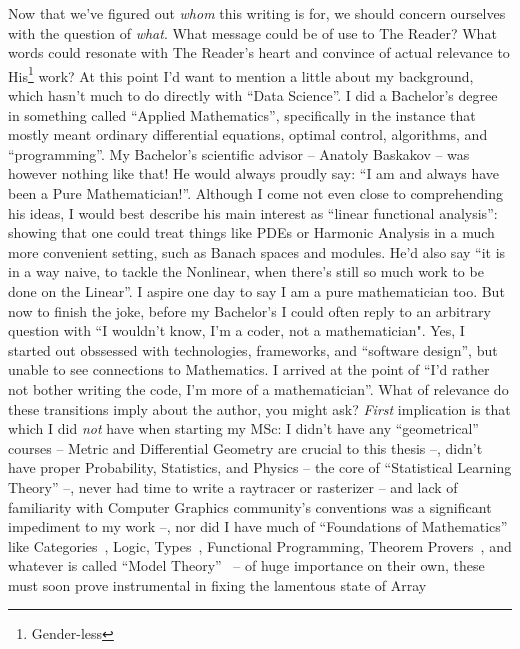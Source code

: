 Now that we've figured out \emph{whom} this writing is for, we should concern
ourselves with the question of \emph{what}. What message could be of use to The
Reader? What words could resonate with The Reader's heart and convince of
actual relevance to His\footnote{Gender-less} work?  At this point
I'd want to mention a little about my background, which hasn't much to do
directly with ``Data Science''. I did a Bachelor's degree in something called
``Applied Mathematics'', specifically in the instance that mostly meant
ordinary differential equations, optimal control, algorithms, and
``programming''. My Bachelor's scientific advisor -- Anatoly Baskakov -- was
however nothing like that! He would always proudly say: ``I am and always have
been a Pure Mathematician!''.  Although I come not even close to comprehending
his ideas, I would best describe his main interest as ``linear functional
analysis'': showing that one could treat things like PDEs or Harmonic Analysis
in a much more convenient setting, such as Banach spaces and modules. He'd also
say ``it is in a way naive, to tackle the Nonlinear, when there's still so much
work to be done on the Linear''. I aspire one day to say I am a pure
mathematician too.  But now to finish the joke, before my Bachelor's I could
often reply to an arbitrary question with ``I wouldn't know, I'm a coder, not a
mathematician".  Yes, I started out obssessed with technologies, frameworks, and
``software design'', but unable to see connections to Mathematics. I arrived at
the point of ``I'd rather not bother writing the code, I'm more of a
mathematician''. What of relevance do these transitions imply about the author,
you might ask?  \emph{First} implication is that which I did \emph{not} have
when starting my MSc:  I didn't have any ``geometrical'' courses -- Metric and
Differential Geometry are crucial to this thesis --, didn't have proper
Probability, Statistics, and Physics -- the core of ``Statistical Learning
Theory'' --, never had time to write a raytracer or rasterizer -- and lack of
familiarity with Computer Graphics community's conventions was a significant
impediment to my work --, nor did I have much of ``Foundations of Mathematics''
like Categories~\citep{categoriesWorking,goldblattTopoi,distributiveLawvere,categoryTheoreticUniversalAlgebra}, Logic,
Types~\cite{thinkingWithTypes}, Functional
Programming, Theorem Provers~\citep{coq,lean,buzzardLean}, and whatever is called ``Model
Theory''~\citep{marker2006model} -- of huge importance on their own, these must
soon prove instrumental in fixing the lamentous state of Array
